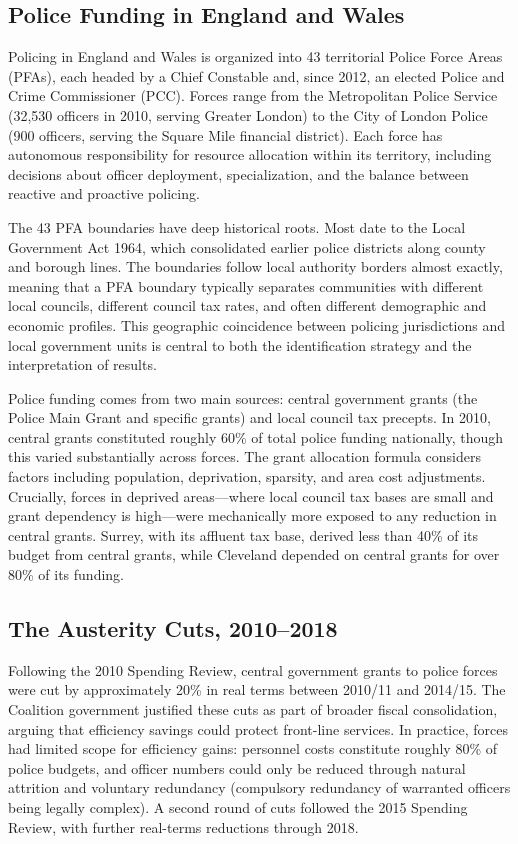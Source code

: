 \documentclass[12pt]{article}
\begin{document}
\subsection{Police Funding in England and Wales}

Policing in England and Wales is organized into 43 territorial Police Force Areas (PFAs), each headed by a Chief Constable and, since 2012, an elected Police and Crime Commissioner (PCC). Forces range from the Metropolitan Police Service (32,530 officers in 2010, serving Greater London) to the City of London Police (900 officers, serving the Square Mile financial district). Each force has autonomous responsibility for resource allocation within its territory, including decisions about officer deployment, specialization, and the balance between reactive and proactive policing.

The 43 PFA boundaries have deep historical roots. Most date to the Local Government Act 1964, which consolidated earlier police districts along county and borough lines. The boundaries follow local authority borders almost exactly, meaning that a PFA boundary typically separates communities with different local councils, different council tax rates, and often different demographic and economic profiles. This geographic coincidence between policing jurisdictions and local government units is central to both the identification strategy and the interpretation of results.

Police funding comes from two main sources: central government grants (the Police Main Grant and specific grants) and local council tax precepts. In 2010, central grants constituted roughly 60\% of total police funding nationally, though this varied substantially across forces. The grant allocation formula considers factors including population, deprivation, sparsity, and area cost adjustments. Crucially, forces in deprived areas---where local council tax bases are small and grant dependency is high---were mechanically more exposed to any reduction in central grants. Surrey, with its affluent tax base, derived less than 40\% of its budget from central grants, while Cleveland depended on central grants for over 80\% of its funding.

\subsection{The Austerity Cuts, 2010--2018}

Following the 2010 Spending Review, central government grants to police forces were cut by approximately 20\% in real terms between 2010/11 and 2014/15. The Coalition government justified these cuts as part of broader fiscal consolidation, arguing that efficiency savings could protect front-line services. In practice, forces had limited scope for efficiency gains: personnel costs constitute roughly 80\% of police budgets, and officer numbers could only be reduced through natural attrition and voluntary redundancy (compulsory redundancy of warranted officers being legally complex). A second round of cuts followed the 2015 Spending Review, with further real-terms reductions through 2018.
\end{document}
